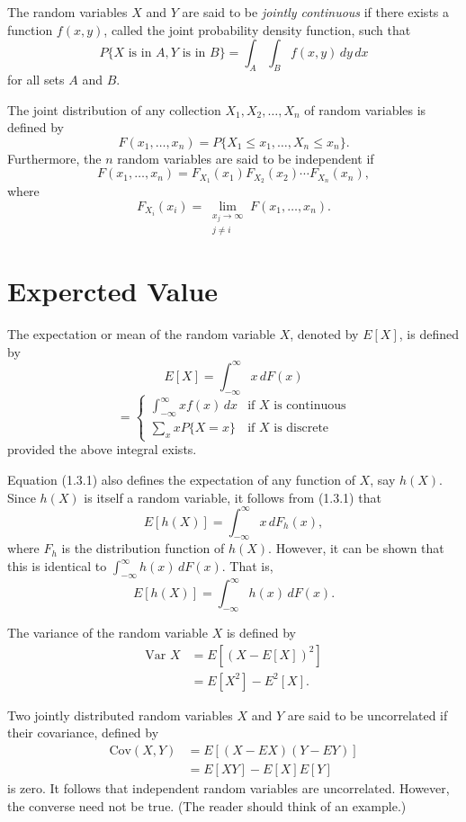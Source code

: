 \documentclass[lang=cn,10pt]{elegantbook}
\begin{document}
The random variables \(X\) and \(Y\) are said to be \textit{jointly continuous} if there exists a function \(f(x, y)\), called the joint probability density function, such that
\[
P\{X \text{ is in } A, Y \text{ is in } B\} = \int_A \int_B f(x, y) \, dy \, dx
\]
for all sets \(A\) and \(B\).

The joint distribution of any collection \(X_1, X_2, \ldots, X_n\) of random variables is defined by
\[
F(x_1, \ldots, x_n) = P\{X_1 \leq x_1, \ldots, X_n \leq x_n\}.
\]
Furthermore, the \(n\) random variables are said to be independent if
\[
F(x_1, \ldots, x_n) = F_{X_1}(x_1) F_{X_2}(x_2) \cdots F_{X_n}(x_n),
\]
where
\[
F_{X_i}(x_i) = \lim_{\substack{x_j \to \infty \\ j \neq i}} F(x_1, \ldots, x_n).
\]
\section{Expercted Value}
The expectation or mean of the random variable \(X\), denoted by \(E[X]\), is defined by
\begin{equation}
E[X] = \int_{-\infty}^{\infty} x \, dF(x)
\end{equation}
\[
= \begin{cases} 
\int_{-\infty}^{\infty} x f(x) \, dx & \text{if } X \text{ is continuous} \\
\sum_{x} x P\{X = x\} & \text{if } X \text{ is discrete}
\end{cases}
\]
provided the above integral exists.

Equation (1.3.1) also defines the expectation of any function of \(X\), say \(h(X)\). Since \(h(X)\) is itself a random variable, it follows from (1.3.1) that
\begin{equation}
E[h(X)] = \int_{-\infty}^{\infty} x \, dF_h(x),
\end{equation}
where \(F_h\) is the distribution function of \(h(X)\). However, it can be shown that this is identical to \(\int_{-\infty}^{\infty} h(x) \, dF(x)\). That is,
\begin{equation}
E[h(X)] = \int_{-\infty}^{\infty} h(x) \, dF(x).
\end{equation}

The variance of the random variable \(X\) is defined by
\begin{align*}
\text{Var } X &= E[(X - E[X])^2] \\
&= E[X^2] - E^2[X].
\end{align*}

Two jointly distributed random variables \(X\) and \(Y\) are said to be uncorrelated if their covariance, defined by
\begin{align*}
\text{Cov}(X, Y) &= E[(X - EX)(Y - EY)] \\
&= E[XY] - E[X]E[Y]
\end{align*}
is zero. It follows that independent random variables are uncorrelated. However, the converse need not be true. (The reader should think of an example.)
\end{document}
